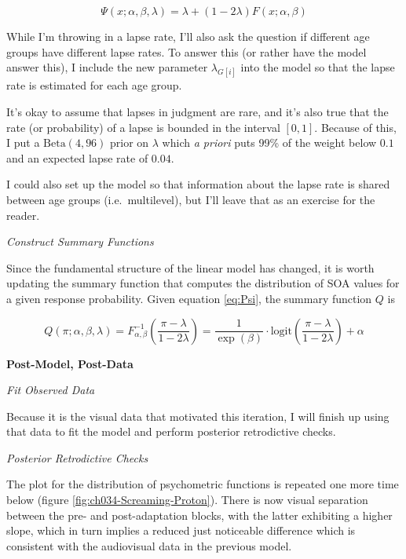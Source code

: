 \documentclass[11pt, oneside, openany]{scrbook}
\begin{document}

\begin{equation}
  \Psi(x; \alpha, \beta, \lambda) = \lambda + (1 - 2\lambda) F(x; \alpha, \beta)
  \label{eq:Psi}
\end{equation}

While I'm throwing in a lapse rate, I'll also ask the question if different age groups have different lapse rates. To answer this (or rather have the model answer this), I include the new parameter \(\lambda_{G[i]}\) into the model so that the lapse rate is estimated for each age group.

It's okay to assume that lapses in judgment are rare, and it's also true that the rate (or probability) of a lapse is bounded in the interval \([0, 1]\). Because of this, I put a \(\mathrm{Beta(4, 96)}\) prior on \(\lambda\) which \emph{a priori} puts 99\% of the weight below \(0.1\) and an expected lapse rate of \(0.04\).

I could also set up the model so that information about the lapse rate is shared between age groups (i.e.~multilevel), but I'll leave that as an exercise for the reader.

\emph{Construct Summary Functions}

Since the fundamental structure of the linear model has changed, it is worth updating the summary function that computes the distribution of SOA values for a given response probability. Given equation \eqref{eq:Psi}, the summary function \(Q\) is


\[
Q(\pi; \alpha, \beta, \lambda) = F_{\alpha, \beta}^{-1}\left(\frac{\pi - \lambda}{1 - 2\lambda}\right) = \frac{1}{\exp(\beta)} \cdot \mathrm{logit}\left(\frac{\pi - \lambda}{1-2\lambda}\right) + \alpha
\]

\textbf{Post-Model, Post-Data}

\emph{Fit Observed Data}

Because it is the visual data that motivated this iteration, I will finish up using that data to fit the model and perform posterior retrodictive checks.

\emph{Posterior Retrodictive Checks}

The plot for the distribution of psychometric functions is repeated one more time below (figure \ref{fig:ch034-Screaming-Proton}). There is now visual separation between the pre- and post-adaptation blocks, with the latter exhibiting a higher slope, which in turn implies a reduced just noticeable difference which is consistent with the audiovisual data in the previous model.
\end{document}
